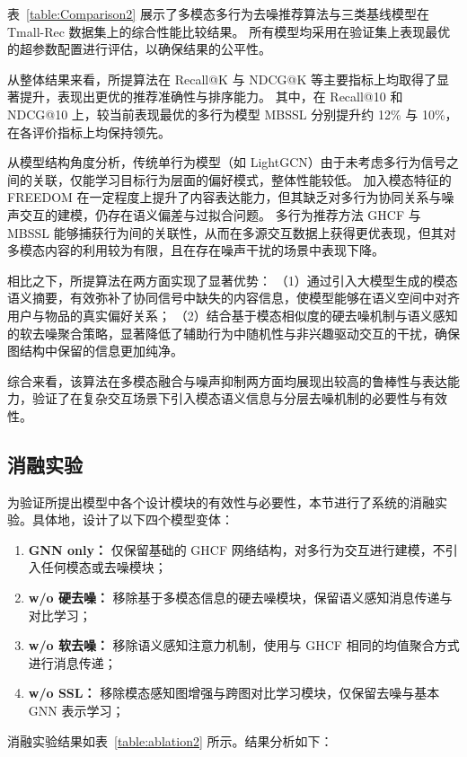 表~\ref{table:Comparison2} 展示了多模态多行为去噪推荐算法与三类基线模型在 Tmall-Rec 数据集上的综合性能比较结果。  
所有模型均采用在验证集上表现最优的超参数配置进行评估，以确保结果的公平性。

从整体结果来看，所提算法在 Recall@K 与 NDCG@K 等主要指标上均取得了显著提升，表现出更优的推荐准确性与排序能力。  
其中，在 Recall@10 和 NDCG@10 上，较当前表现最优的多行为模型 MBSSL 分别提升约 12\% 与 10\%，在各评价指标上均保持领先。

从模型结构角度分析，传统单行为模型（如 LightGCN）由于未考虑多行为信号之间的关联，仅能学习目标行为层面的偏好模式，整体性能较低。  
加入模态特征的 FREEDOM 在一定程度上提升了内容表达能力，但其缺乏对多行为协同关系与噪声交互的建模，仍存在语义偏差与过拟合问题。  
多行为推荐方法 GHCF 与 MBSSL 能够捕获行为间的关联性，从而在多源交互数据上获得更优表现，但其对多模态内容的利用较为有限，且在存在噪声干扰的场景中表现下降。

相比之下，所提算法在两方面实现了显著优势：  
（1）通过引入大模型生成的模态语义摘要，有效弥补了协同信号中缺失的内容信息，使模型能够在语义空间中对齐用户与物品的真实偏好关系；  
（2）结合基于模态相似度的硬去噪机制与语义感知的软去噪聚合策略，显著降低了辅助行为中随机性与非兴趣驱动交互的干扰，确保图结构中保留的信息更加纯净。

综合来看，该算法在多模态融合与噪声抑制两方面均展现出较高的鲁棒性与表达能力，验证了在复杂交互场景下引入模态语义信息与分层去噪机制的必要性与有效性。



\subsection{消融实验}
为验证所提出模型中各个设计模块的有效性与必要性，本节进行了系统的消融实验。具体地，设计了以下四个模型变体：

\begin{enumerate}
    \item \textbf{GNN only：} 仅保留基础的 GHCF 网络结构，对多行为交互进行建模，不引入任何模态或去噪模块；
    \item \textbf{w/o 硬去噪：} 移除基于多模态信息的硬去噪模块，保留语义感知消息传递与对比学习；
    \item \textbf{w/o 软去噪：} 移除语义感知注意力机制，使用与 GHCF 相同的均值聚合方式进行消息传递；
    \item \textbf{w/o SSL：} 移除模态感知图增强与跨图对比学习模块，仅保留去噪与基本 GNN 表示学习；
\end{enumerate}

消融实验结果如表~\ref{table:ablation2} 所示。结果分析如下：

